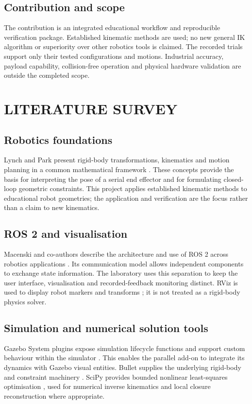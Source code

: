 \documentclass[11pt,a4paper,oneside]{report}
\begin{document}
\section{Contribution and scope}
The contribution is an integrated educational workflow and reproducible verification package. Established kinematic methods are used; no new general IK algorithm or superiority over other robotics tools is claimed. The recorded trials support only their tested configurations and motions. Industrial accuracy, payload capability, collision-free operation and physical hardware validation are outside the completed scope.

\chapter{LITERATURE SURVEY}
\section{Robotics foundations}
Lynch and Park present rigid-body transformations, kinematics and motion planning in a common mathematical framework \cite{modern}. These concepts provide the basis for interpreting the pose of a serial end effector and for formulating closed-loop geometric constraints. This project applies established kinematic methods to educational robot geometries; the application and verification are the focus rather than a claim to new kinematics.

\section{ROS 2 and visualisation}
Macenski and co-authors describe the architecture and use of ROS 2 across robotics applications \cite{ros2}. Its communication model allows independent components to exchange state information. The laboratory uses this separation to keep the user interface, visualisation and recorded-feedback monitoring distinct. RViz is used to display robot markers and transforms \cite{rviz}; it is not treated as a rigid-body physics solver.

\section{Simulation and numerical solution tools}
Gazebo System plugins expose simulation lifecycle functions and support custom behaviour within the simulator \cite{gzplugin}. This enables the parallel add-on to integrate its dynamics with Gazebo visual entities. Bullet supplies the underlying rigid-body and constraint machinery \cite{bullet}. SciPy provides bounded nonlinear least-squares optimisation \cite{scipy}, used for numerical inverse kinematics and local closure reconstruction where appropriate.
\end{document}
